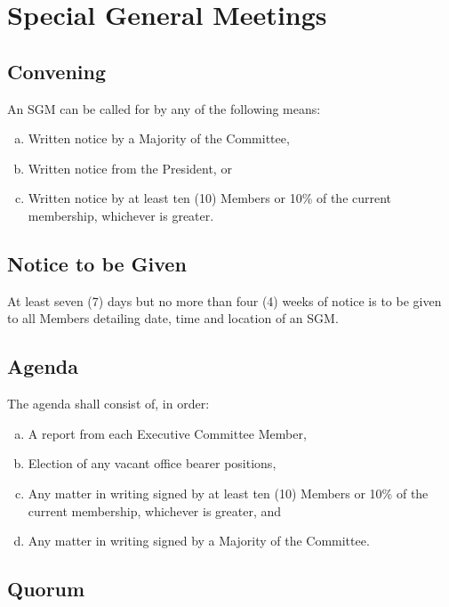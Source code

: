 \documentclass[a4paper,12pt]{article}
\begin{document}
\section{Special General Meetings}

\subsection{Convening}

An SGM can be called for by any of the following means:

\begin{enumerate}[a)]
	\item Written notice by a Majority of the Committee,
	\item Written notice from the President, or
	\item Written notice by at least ten (10) Members or 10\% of the current membership, whichever is greater.
\end{enumerate}

\subsection{Notice to be Given}

At least seven (7) days but no more than four (4) weeks of notice is to be given to all Members detailing date, time and location of an SGM.

\subsection{Agenda}

The agenda shall consist of, in order:

\begin{enumerate}[a)]
	\item A report from each Executive Committee Member,
	\item Election of any vacant office bearer positions,
	\item Any matter in writing signed by at least ten (10) Members or 10\% of the current membership, whichever is greater, and
	\item Any matter in writing signed by a Majority of the Committee.
\end{enumerate}

\subsection{Quorum}
\end{document}
